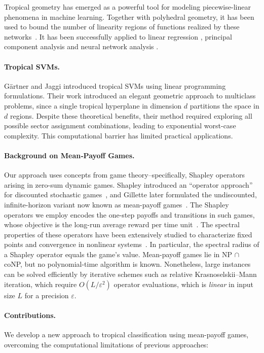 \documentclass{article}
\begin{document}
Tropical geometry has emerged as a powerful tool for modeling piecewise-linear phenomena in machine learning. Together with polyhedral geometry,
it has been used to bound the number of linearity regions of functions realized by these networks~\cite{zhang2018,montufar}.
It has been successfully applied to linear regression \cite{maragos2020,akian2020}, principal component analysis \cite{yoshida2019} and neural network analysis \cite{maragos2021}.

\paragraph{Tropical SVMs.} Gärtner and Jaggi \cite{gartner2008} introduced tropical SVMs using linear programming formulations. Their work introduced an elegant geometric approach to multiclass problems, since a single tropical hyperplane in dimension $d$ partitions the space in $d$ regions.
Despite these theoretical benefits, their method required exploring all possible sector assignment combinations, leading to exponential worst-case complexity. This computational barrier has limited practical applications.

\paragraph{Background on Mean‐Payoff Games.}
Our approach uses concepts from game theory--specifically, Shapley operators arising in zero-sum dynamic games.
Shapley introduced an ``operator approach'' for discounted stochastic games~\cite{shapley1953}, and Gillette later formulated the undiscounted, infinite-horizon variant now known as mean-payoff games~\cite{gillette1957}.
The Shapley operators we employ encodes the one-step payoffs and transitions in such games, whose objective is the long-run average reward per time unit~\cite{zwick1996}. 
The spectral properties of these operators have been extensively studied to characterize fixed points and convergence in nonlinear systems~\cite{kolokoltsov1997,gaubert2004}.
In particular, the spectral radius of a Shapley operator equals the game's value.
Mean-payoff games lie in NP $\cap$ coNP, but no polynomial-time algorithm is known.
Nonetheless, large instances can be solved efficiently by iterative schemes such as relative Krasnoselskii--Mann iteration, which require $O(L/\varepsilon^2)$ operator evaluations, which is \emph{linear} in input size $L$ for a precision $\varepsilon$.

\paragraph{Contributions.} We develop a new approach to tropical classification using mean-payoff games,
overcoming the computational limitations of previous approaches:
\end{document}
